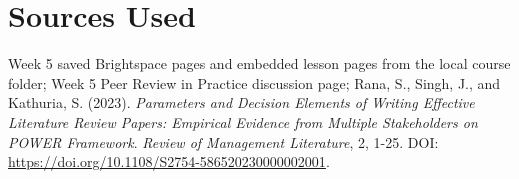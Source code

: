 \documentclass[10pt,letterpaper]{article}
\begin{document}
\section*{Sources Used}
\small
Week 5 saved Brightspace pages and embedded lesson pages from the local course folder; Week 5 Peer Review in Practice discussion page; Rana, S., Singh, J., and Kathuria, S. (2023). \emph{Parameters and Decision Elements of Writing Effective Literature Review Papers: Empirical Evidence from Multiple Stakeholders on POWER Framework}. \emph{Review of Management Literature}, 2, 1-25. DOI: \url{https://doi.org/10.1108/S2754-586520230000002001}.
\end{document}
